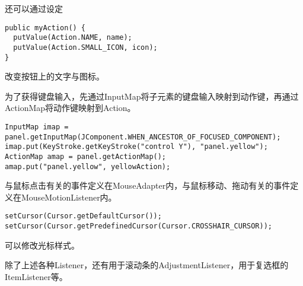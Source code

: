 \documentclass{ctexart}
\begin{document}
还可以通过设定
\begin{lstlisting}
public myAction() {
  putValue(Action.NAME, name);
  putValue(Action.SMALL_ICON, icon);
}
\end{lstlisting}
改变按钮上的文字与图标。
\par
为了获得键盘输入，先通过InputMap将子元素的键盘输入映射到动作键，再通过ActionMap将动作键映射到Action。
\begin{lstlisting}
InputMap imap = panel.getInputMap(JComponent.WHEN_ANCESTOR_OF_FOCUSED_COMPONENT);
imap.put(KeyStroke.getKeyStroke("control Y"), "panel.yellow");
ActionMap amap = panel.getActionMap();
amap.put("panel.yellow", yellowAction);
\end{lstlisting}
与鼠标点击有关的事件定义在MouseAdapter内，与鼠标移动、拖动有关的事件定义在MouseMotionListener内。
\begin{lstlisting}
setCursor(Cursor.getDefaultCursor());
setCursor(Cursor.getPredefinedCursor(Cursor.CROSSHAIR_CURSOR));
\end{lstlisting}
可以修改光标样式。
\par
除了上述各种Listener，还有用于滚动条的AdjustmentListener，用于复选框的ItemListener等。
\end{document}
